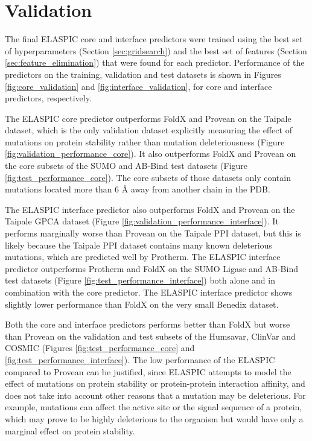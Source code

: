 \clearpage
\section{Validation} \label{sec:validation}

The final ELASPIC core and interface predictors were trained using the best set of hyperparameters (Section \ref{sec:gridsearch}) and the best set of features (Section \ref{sec:feature_elimination}) that were found for each predictor. Performance of the predictors on the training, validation and test datasets is shown in Figures \ref{fig:core_validation} and \ref{fig:interface_validation}, for core and interface predictors, respectively.

The ELASPIC core predictor outperforms FoldX and Provean on the Taipale dataset, which is the only validation dataset explicitly measuring the effect of mutations on protein stability rather than mutation deleteriousness (Figure \ref{fig:validation_performance_core}). It also outperforms FoldX and Provean on the core subsets of the SUMO and AB-Bind test datasets (Figure \ref{fig:test_performance_core}). The core subsets of those datasets only contain mutations located more than 6 {\AA} away from another chain in the PDB.

The ELASPIC interface predictor also outperforms FoldX and Provean on the Taipale GPCA dataset (Figure \ref{fig:validation_performance_interface}). It performs marginally worse than Provean on the Taipale PPI dataset, but this is likely because the Taipale PPI dataset contains many known deleterious mutations, which are predicted well by Protherm. The ELASPIC interface predictor outperforms Protherm and FoldX on the SUMO Ligase and AB-Bind test datasets (Figure \ref{fig:test_performance_interface}) both alone and in combination with the core predictor. The ELASPIC interface predictor shows slightly lower performance than FoldX on the very small Benedix dataset.

Both the core and interface predictors performs better than FoldX but worse than Provean on the validation and test subsets of the Humsavar, ClinVar and COSMIC (Figures \ref{fig:test_performance_core} and \ref{fig:test_performance_interface}). The low performance of the ELASPIC compared to Provean can be justified, since ELASPIC attempts to model the effect of mutations on protein stability or protein-protein interaction affinity, and does not take into account other reasons that a mutation may be deleterious. For example, mutations can affect the active site or the signal sequence of a protein, which may prove to be highly deleterious to the organism but would have only a marginal effect on protein stability.

\clearpage

